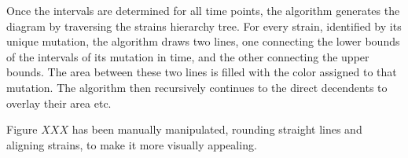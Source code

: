 \documentclass[notitlepage]{article}
\begin{document}
Once the intervals are determined for all time points, the algorithm generates the diagram by traversing the strains hierarchy tree.
For every strain, identified by its unique mutation, the algorithm draws two lines, one connecting the lower bounds of the intervals of its mutation in time, and the other connecting the upper bounds.
The area between these two lines is filled with the color assigned to that mutation.
The algorithm then recursively continues to the direct decendents to overlay their area etc.

Figure $XXX$ has been manually manipulated, rounding straight lines and aligning strains, to make it more visually appealing.
\end{document}

